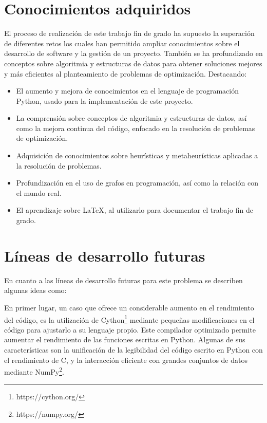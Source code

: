 
\section{Conocimientos adquiridos}

El proceso de realización de este trabajo fin de grado ha supuesto la superación de diferentes retos los cuales han permitido ampliar conocimientos sobre el desarrollo de software y la gestión de un proyecto. También se ha profundizado en conceptos sobre algoritmia y estructuras de datos para obtener soluciones mejores y más eficientes al planteamiento de problemas de optimización. Destacando:

\begin{itemize}
  \item El aumento y mejora de conocimientos en el lenguaje de programación Python, usado para la implementación de este proyecto.
  \item La comprensión sobre conceptos de algoritmia y estructuras de datos, así como la mejora continua del código, enfocado en la resolución de problemas de optimización.
  \item Adquisición de conocimientos sobre heurísticas y metaheurísticas aplicadas a la resolución de problemas.
  \item Profundización en el uso de grafos en programación, así como la relación con el mundo real.
  \item El aprendizaje sobre \LaTeX, al utilizarlo para documentar el trabajo fin de grado.
\end{itemize}

\section{Líneas de desarrollo futuras}
En cuanto a las líneas de desarrollo futuras para este problema se describen algunas ideas como:

En primer lugar, un caso que ofrece un considerable aumento en el rendimiento del código, es la utilización de Cython\footnote{https://cython.org/} mediante pequeñas modificaciones en el código para ajustarlo a su lenguaje propio. Este compilador optimizado permite aumentar el  rendimiento de las funciones escritas en Python. Algunas de sus características son la unificación de la legibilidad del código escrito en Python con el rendimiento de C, y la interacción eficiente con grandes conjuntos de datos mediante NumPy\footnote{https://numpy.org/}.

